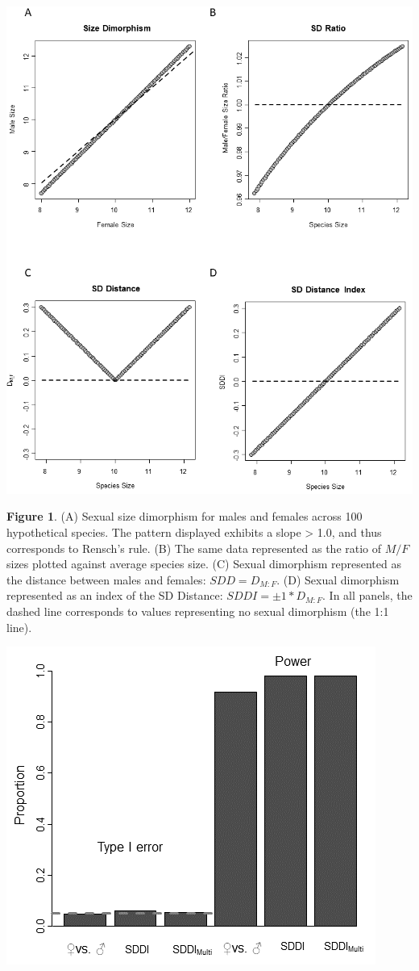 \documentclass[]{article}
\begin{document}
\includegraphics[width=0.95\linewidth]{Fig1}

\singlespacing \textbf{Figure 1}. (A) Sexual size dimorphism for males
and females across 100 hypothetical species. The pattern displayed
exhibits a slope \textgreater{} 1.0, and thus corresponds to Rensch's
rule. (B) The same data represented as the ratio of \(M/F\) sizes
plotted against average species size. (C) Sexual dimorphism represented
as the distance between males and females: \(SDD = D_{M:F}\). (D) Sexual
dimorphism represented as an index of the SD Distance:
\(SDDI = \pm1*D_{M:F}\). In all panels, the dashed line corresponds to
values representing no sexual dimorphism (the 1:1 line). \hfill\break

\newpage

\includegraphics[width=0.7\linewidth]{Fig2}
\end{document}
